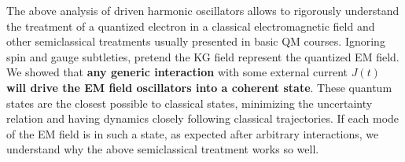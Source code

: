 \documentclass[../QFT_main.tex]{subfiles}
\begin{document}
\begin{mytheorem}
%
The above analysis of driven harmonic oscillators allows to rigorously understand the treatment of a quantized electron in a classical electromagnetic field and other semiclassical treatments usually presented in basic QM courses.
Ignoring spin and gauge subtleties, pretend the {\small KG} field represent the quantized {\small EM} field.
We showed that \textbf{any generic interaction} with some external current $J(t)$ \textbf{will drive the {\small EM} field oscillators into a coherent state}.
These quantum states are the closest possible to classical states, minimizing the uncertainty relation and having dynamics closely following classical trajectories.
If each mode of the EM field is in such a state, as expected after arbitrary interactions, we understand why the above semiclassical treatment works so well.


\end{mytheorem}
\end{document}
